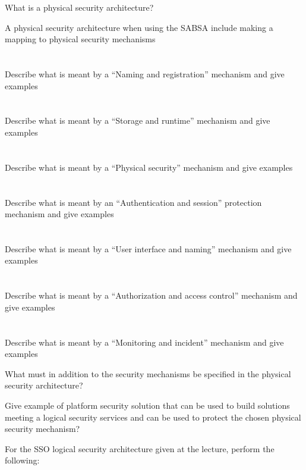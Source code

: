 \begin{questions}
\begin{parts}
  \end{parts}

\item What is a physical security architecture?
\item A physical security architecture when using the SABSA include making a mapping to physical security mechanisms
  \begin{parts}
  \part{} Describe what is meant by a ``Naming and registration'' mechanism and give examples
  \part{} Describe what is meant by a ``Storage and runtime'' mechanism and give examples
  \part{} Describe what is meant by a ``Physical security'' mechanism and give examples
  \part{} Describe what is meant by an ``Authentication and session'' protection mechanism and give examples
  \part{} Describe what is meant by a ``User interface and naming'' mechanism and give examples
  \part{} Describe what is meant by a ``Authorization and access control'' mechanism and give examples
  \part{} Describe what is meant by a ``Monitoring and incident'' mechanism and give examples
  \end{parts}

\item What must in addition to the security mechanisms be specified in the physical security architecture?
\item Give example of platform security solution that can be used to build solutions meeting a logical security services and can be used to protect the chosen physical security mechanism?
\item For the SSO logical security architecture given at the lecture, perform the following:
  \begin{parts}

\end{parts}
\end{questions}
